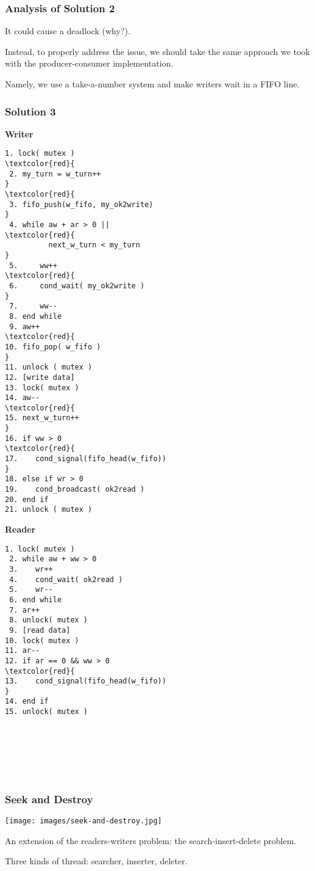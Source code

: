 \begin{frame}
	\frametitle{Analysis of Solution 2}

	It could cause a deadlock (why?).


	Instead, to properly address the issue, we should take the same approach we took with the producer-consumer implementation.

	Namely, we use a \alert{take-a-number} system and make writers wait in a FIFO line.

\end{frame}

\begin{frame}[fragile]
	\frametitle{Solution 3}

	\begin{multicols}{2}
		\footnotesize
		\textbf{Writer}
		\begin{Verbatim}[commandchars=\\\{\}]
 1. lock( mutex )
\textcolor{red}{
 2. my_turn = w_turn++
}
\textcolor{red}{
 3. fifo_push(w_fifo, my_ok2write)
}
 4. while aw + ar > 0 ||
\textcolor{red}{
          next_w_turn < my_turn
}
 5.     ww++
\textcolor{red}{
 6.     cond_wait( my_ok2write )
}
 7.     ww--
 8. end while
 9. aw++
\textcolor{red}{
10. fifo_pop( w_fifo )
}
11. unlock ( mutex )
12. [write data]
13. lock( mutex )
14. aw--
\textcolor{red}{
15. next_w_turn++
}
16. if ww > 0
\textcolor{red}{
17.    cond_signal(fifo_head(w_fifo))
}
18. else if wr > 0
19.    cond_broadcast( ok2read )
20. end if
21. unlock ( mutex )
    \end{Verbatim}
    \columnbreak
    \textbf{Reader}
    \begin{Verbatim}[commandchars=\\\{\}]
 1. lock( mutex )
 2. while aw + ww > 0
 3.    wr++
 4.    cond_wait( ok2read )
 5.    wr--
 6. end while
 7. ar++
 8. unlock( mutex )
 9. [read data]
10. lock( mutex )
11. ar--
12. if ar == 0 && ww > 0
\textcolor{red}{
13.    cond_signal(fifo_head(w_fifo))
}
14. end if
15. unlock( mutex )







    \end{Verbatim}
\end{multicols}
\vspace{-2em}

\end{frame}


\begin{frame}
	\frametitle{Seek and Destroy}

	\begin{center}
		\texttt{[image: images/seek-and-destroy.jpg]}
	\end{center}
	An extension of the readers-writers problem: the search-insert-delete problem.

	Three kinds of thread: searcher, inserter, deleter.

\end{frame}


